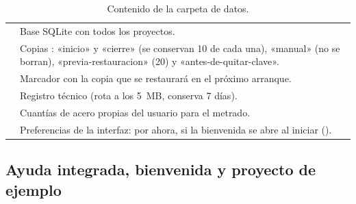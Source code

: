 \begin{table}[H]
	\centering
	\caption{Contenido de la carpeta de datos.}
	\label{tab:t-carpeta}
	\begin{tabular}{L{4cm}L{9.8cm}}
		\hline
		 & Base SQLite con todos los proyectos. \\
		 & Copias : «inicio» y «cierre» (se conservan
		                 10 de cada una), «manual» (no se borran), «previa-restauracion» (20) y «antes-de-quitar-clave». \\
		 & Marcador con la copia que se restaurará en el próximo arranque. \\
		 & Registro técnico (rota a los 5~MB, conserva 7 días). \\
		 & Cuantías de acero propias del usuario para el metrado. \\
		 & Preferencias de la interfaz: por ahora, si la bienvenida se abre al iniciar
		(). \\ \hline
	\end{tabular}
\end{table}

\subsection{Ayuda integrada, bienvenida y proyecto de ejemplo}

